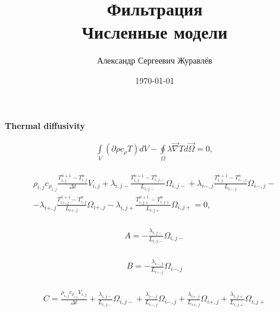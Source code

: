\documentclass[a4paper,12pt,russian]{extreport}
\author{Александр Сергеевич Журавлёв}
\title{Фильтрация\\Численные модели}
\date{\today}
\begin{document}
\pagecolor{pageColor}
\color{fontColor}
\Russian
\printnomenclature[5em]

\begin{center}
{\large \textbf{Thermal diffusivity}}
\end{center}

\begin{eqnarray}
\label{eq:phys_TD}
\int \limits_{V} \left( \partial{\rho c_{\rho} T} \right) d V - \oint \limits_{\Omega} \lambda \vec{\nabla}T d\vec{\Omega} = 0,
\end{eqnarray}

\begin{eqnarray}
\label{eq:num_TD}
\begin{gathered}
\rho_{i,j} c_{\rho_{i,j}} \frac{T^{n+1}_{i,j} - T^{n}_{i,j}}{\Delta t} V_{i,j} + \lambda_{i,j-}\frac{T^{n+1}_{i,j} - T^{n}_{i,j-}}{L_{i,j-}} \Omega_{i,j-} + \lambda_{i-,j}\frac{T^{n+1}_{i,j} - T^{n}_{i-,j}}{L_{i-,j}} \Omega_{i-,j} - \\
- \lambda_{i+,j}\frac{T^{n+1}_{i+,j} - T^{n}_{i,j}}{L_{i+,j}} \Omega_{i+,j} - \lambda_{i,j+}\frac{T^{n+1}_{i,j+} - T^{n}_{i,j+}}{L_{i,j+}} \Omega_{i,j+} = 0,
\end{gathered}
\end{eqnarray}

\begin{eqnarray}
\begin{gathered}
\label{eq:A_coeff}
A = - \frac{\lambda_{i,j-}}{L_{i,j-}} \Omega_{i,j-}
\end{gathered}
\end{eqnarray}

\begin{eqnarray}
\begin{gathered}
\label{eq:B_coeff}
B = - \frac{\lambda_{i-,j}}{L_{i-,j}} \Omega_{i-,j}
\end{gathered}
\end{eqnarray}

\begin{eqnarray}
\begin{gathered}
\label{eq:B_coeff}
C = \frac{\rho_{i,j} c_{\rho_{i,j}} V_{i,j}}{\Delta t} + \frac{\lambda_{i,j-}}{L_{i,j-}} \Omega_{i,j-} + \frac{\lambda_{i-,j}}{L_{i-,j}} \Omega_{i-,j} + \frac{\lambda_{i+,j}}{L_{i+,j}} \Omega_{i+,j} + \frac{\lambda_{i,j+}}{L_{i,j+}} \Omega_{i,j+}
\end{gathered}
\end{eqnarray}
\end{document}

